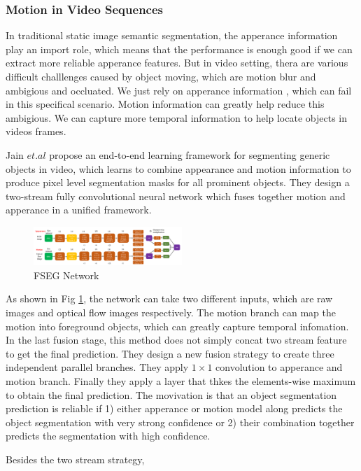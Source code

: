 \subsubsection{Motion in Video Sequences}
In traditional static image semantic segmentation, the apperance information play an import role, which means that 
the performance is enough good if we can extract more reliable apperance features. But in video setting, thera are various
difficult challlenges caused by object moving, which are motion blur and ambigious and occluated. We just rely on apperance information
, which can  fail in this specifical scenario. Motion information can greatly help reduce this ambigious. We can capture more temporal information
to help locate objects in videos frames.

Jain $et.al$ \cite{Jain2017FusionSeg} propose an end-to-end learning framework for segmenting generic objects in video,
which learns to combine appearance and motion information to produce pixel level segmentation masks for all prominent objects.
They design a two-stream fully convolutional neural network which fuses together motion and apperance in a unified framework.
\begin{figure}[ht]
    \centering
    \includegraphics[width=0.5\textwidth]{./figure/FSEG_NET.png}
    \caption{FSEG Network}
    \label{FSEG}
\end{figure}

As shown in Fig \ref{FSEG}, the network can take two different inputs, which are raw images and optical flow images respectively.
The motion branch can map the motion into foreground objects, which can greatly capture temporal infomation.
In the last fusion stage, this method does not simply concat two stream feature to get the final prediction.
They design a new fusion strategy to create three independent parallel branches. They apply $1\times1$ convolution to apperance and
motion branch. Finally they apply a layer that thkes the elements-wise maximum to obtain the final prediction. The movivation is that 
an object segmentation prediction is reliable if 1) either apperance or motion model along predicts the object 
segmentation with very strong confidence or 2) their combination together predicts the segmentation with high confidence. 

Besides the two stream strategy, 




